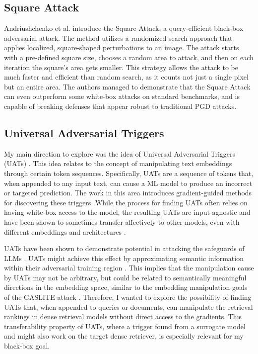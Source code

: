 \documentclass[a4paper, sigconf]{acmart}
\begin{document}
\subsection{Square Attack}

Andriushchenko et al. \cite{andriushchenko2020} introduce the Square Attack, a query-efficient black-box adversarial attack. The method utilizes a randomized search approach that applies localized, square-shaped perturbations to an image. The attack starts with a pre-defined square size, chooses a random area to attack, and then on each iteration the square's area gets smaller. This strategy allows the attack to be much faster and efficient than random search, as it counts not just a single pixel but an entire area. The authors managed to demonstrate that the Square Attack can even outperform some white-box attacks on standard benchmarks, and is capable of breaking defenses that appear robust to traditional PGD attacks. 


\subsection{Universal Adversarial Triggers}

My main direction to explore was the idea of Universal Adversarial Triggers (UATs) \cite{wallace2021}. This idea relates to the concept of manipulating text embeddings through certain token sequences. Specifically, UATs are a sequence of tokens that, when appended to any input text, can cause a ML model to produce an incorrect or targeted prediction. The work in this area introduces gradient-guided methods for discovering these triggers. While the process for finding UATs often relies on having white-box access to the model, the resulting UATs are input-agnostic and have been shown to sometimes transfer affectively to other models, even with different embeddings and architectures \cite{wallace2021}.

UATs have been shown to demonstrate potential in attacking the safeguards of LLMs \cite{liang2025}. UATs might achieve this effect by approximating semantic information within their adversarial training region \cite{subhash2023}. This implies that the manipulation cause by UATs may not be arbitrary, but could be related to semantically meaningful directions in the embedding space, similar to the embedding manipulation goals of the GASLITE attack \cite{bentov2024}. Therefore, I wanted to explore the possibility of finding UATs that, when appended to queries or documents, can manipulate the retrieval rankings in dense retrieval models without direct access to the gradients. This transferability property of UATs, where a trigger found from a surrogate model and might also work on the target dense retriever, is especially relevant for my black-box goal. 
\end{document}
